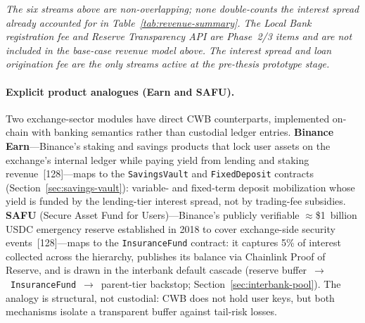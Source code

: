\documentclass[12pt,a4paper]{report}
\begin{document}
\vspace{2pt}
\noindent\textit{\small The six streams above are non-overlapping; none double-counts the interest spread already accounted for in Table~\ref{tab:revenue-summary}. The Local Bank registration fee and Reserve Transparency API are Phase~2/3 items and are not included in the base-case revenue model above. The interest spread and loan origination fee are the only streams active at the pre-thesis prototype stage.}

\paragraph{Explicit product analogues (Earn and SAFU).}
Two exchange-sector modules have direct CWB counterparts, implemented on-chain with banking semantics rather than custodial ledger entries. \textbf{Binance Earn}---Binance's staking and savings products that lock user assets on the exchange's internal ledger while paying yield from lending and staking revenue~[128]---maps to the \texttt{SavingsVault} and \texttt{FixedDeposit} contracts (Section~\ref{sec:savings-vault}): variable- and fixed-term deposit mobilization whose yield is funded by the lending-tier interest spread, not by trading-fee subsidies. \textbf{SAFU} (Secure Asset Fund for Users)---Binance's publicly verifiable $\approx$\$1~billion USDC emergency reserve established in 2018 to cover exchange-side security events~[128]---maps to the \texttt{InsuranceFund} contract: it captures 5\% of interest collected across the hierarchy, publishes its balance via Chainlink Proof of Reserve, and is drawn in the interbank default cascade (reserve buffer~$\to$~\texttt{InsuranceFund}~$\to$~parent-tier backstop; Section~\ref{sec:interbank-pool}). The analogy is structural, not custodial: CWB does not hold user keys, but both mechanisms isolate a transparent buffer against tail-risk losses.
\end{document}
